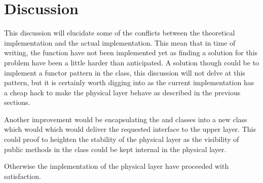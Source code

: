 \section{Discussion}
This discussion will elucidate some of the conflicts between the theoretical implementation and the actual implementation. This mean that in time of writing, the  function have not been implemented yet as finding a solution for this problem have been a little harder than anticipated. A solution though could be to implement a functor pattern in the  class, this discussion will not delve at this pattern, but it is certainly worth digging into as the current implementation has a cheap hack to make the physical layer behave as described in the previous sections.

Another improvement would be encapsulating the  and  classes into a new class which would which would deliver the requested interface to the upper layer. This could proof to heighten the stability of the physical layer as the visibility of public methods in the  class could be kept internal in the physical layer.

Otherwise the implementation of the physical layer have proceeded with satisfaction.